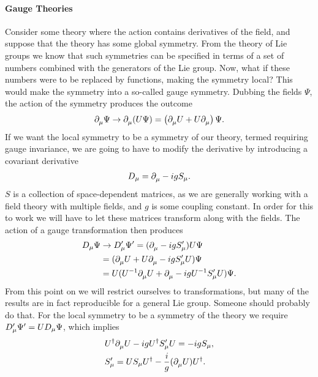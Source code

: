\paragraph{Gauge Theories}
Consider some theory where the action contains derivatives of the field, and suppose that the theory has some global symmetry. From the theory of Lie groups we know that such symmetries can be specified in terms of a set of numbers combined with the generators of the Lie group. Now, what if these numbers were to be replaced by functions, making the symmetry local? This would make the symmetry into a so-called gauge symmetry. Dubbing the fields $\Psi$, the action of the symmetry produces the outcome
\begin{align*}
\partial^{}_{\mu}\Psi\to \partial^{}_{\mu}(U\Psi) = \left(\partial^{}_{\mu}U + U\partial^{}_{\mu}\right)\Psi.
\end{align*}
If we want the local symmetry to be a symmetry of our theory, termed requiring gauge invariance, we are going to have to modify the derivative by introducing a covariant derivative
\begin{align*}
D_{\mu} = \partial^{}_{\mu} - igS_{\mu}.
\end{align*}
$S$ is a collection of space-dependent matrices, as we are generally working with a field theory with multiple fields, and $g$ is some coupling constant. In order for this to work we will have to let these matrices transform along with the fields. The action of a gauge transformation then produces
\begin{align*}
D_{\mu}\Psi &\to D_{\mu}^{\prime}\Psi^{\prime} = (\partial^{}_{\mu} - igS_{\mu}^{\prime})U\Psi \\
&= (\partial^{}_{\mu}U + U\partial^{}_{\mu} - igS_{\mu}^{\prime} U)\Psi \\
&= U(U^{-1}\partial^{}_{\mu}U + \partial^{}_{\mu} - igU^{-1}S_{\mu}^{\prime} U)\Psi.
\end{align*}
From this point on we will restrict ourselves to  transformations, but many of the results are in fact reproducible for a general Lie group. Someone should probably do that. For the local symmetry to be a symmetry of the theory we require $D_{\mu}^{\prime}\Psi^{\prime} = UD_{\mu}\Psi$, which implies
\begin{align*}
&U^{\dagger}\partial^{}_{\mu}U - igU^{\dagger} S_{\mu}^{\prime} U = -igS_{\mu}, \\
&S_{\mu}^{\prime} = US_{\mu}U^{\dagger} - \frac{i}{g}(\partial^{}_{\mu}U)U^{\dagger}.
\end{align*}

